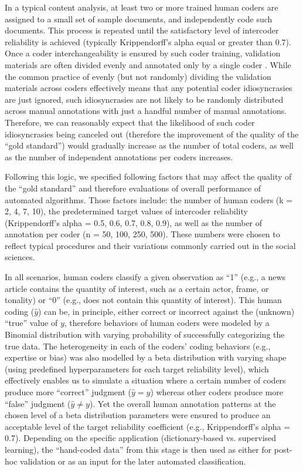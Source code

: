 \documentclass[man, 12pt, a4paper, nolmodern, noextraspace]{apa6}
\begin{document}
    In a typical content analysis, at least two or more trained human coders are assigned to a small set of sample documents, and independently code such documents. This process is repeated until the satisfactory level of intercoder reliability is achieved (typically Krippendorff’s alpha equal or greater than 0.7). Once a coder interchangeability is ensured by such coder training, validation materials are often divided evenly and annotated only by a single coder \parencite{grimmer2018unreliability}. While the common practice of evenly (but not randomly) dividing the validation materials across coders effectively means that any potential coder idiosyncrasies are just ignored, such idiosyncrasies are not likely to be randomly distributed across manual annotations with just a handful number of manual annotations. Therefore, we can reasonably expect that the likelihood of such coder idiosyncrasies being canceled out (therefore the improvement of the quality of the “gold standard”) would gradually increase as the number of total coders, as well as the number of independent annotations per coders increases.        
    
    Following this logic, we specified following factors that may affect the quality of the “gold standard” and therefore evaluations of overall performance of automated algorithms. Those factors include: the number of human coders (k = 2, 4, 7, 10), the predetermined target values of intercoder reliability (Krippendorff's alpha = 0.5, 0.6, 0.7, 0.8, 0.9), as well as the number of annotation per coder (n = 50, 100, 250, 500). These numbers were chosen to reflect typical procedures and their variations commonly carried out in the social sciences.
    
    In all scenarios, human coders classify a given observation as ``1'' (e.g., a news article contains the quantity of interest, such as a certain actor, frame, or tonality) or ``0'' (e.g., does not contain this quantity of interest). This human coding ($\hat{y}$) can be, in principle, either correct or incorrect against the (unknown) “true” value of $y$, therefore behaviors of human coders were modeled by a Binomial distribution with varying probability of successfully categorizing the true data. The heterogeneity in each of the coders’ coding behaviors (e.g., expertise or bias) was also modelled by a beta distribution with varying shape (using predefined hyperparameters for each target reliability level), which effectively enables us to simulate a situation where a certain number of coders produce more “correct” judgment ($\hat{y} = y$) whereas other coders produce more ``false'' judgment ($\hat{y} \neq y$). Yet the overall human annotation patterns at the chosen level of a beta distribution parameters were ensured to produce an acceptable level of the target reliability coefficient (e.g., Krippendorff's alpha = 0.7). Depending on the specific application (dictionary-based vs. supervised learning), the \enquote{hand-coded data} from this stage is then used as either for post-hoc validation or as an input for the later automated classification. 
    
\end{document}

